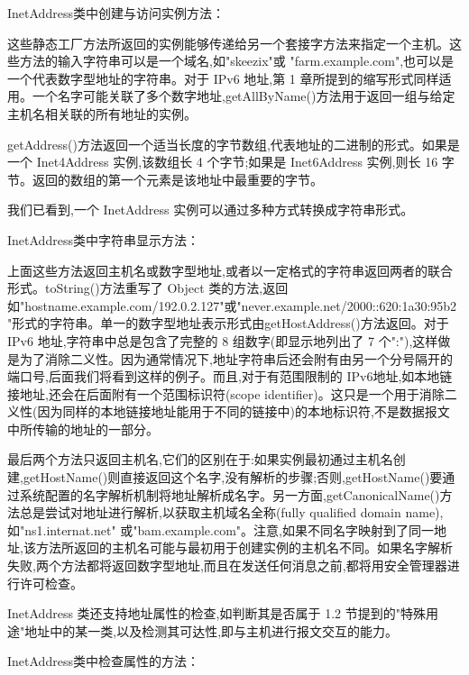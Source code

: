 		InetAddress类中创建与访问实例方法：

		

		这些静态工厂方法所返回的实例能够传递给另一个套接字方法来指定一个主机。这些方法的输入字符串可以是一个域名,如"skeezix"或 "farm.example.com",也可以是一个代表数字型地址的字符串。对于 IPv6 地址,第 1 章所提到的缩写形式同样适用。一个名字可能关联了多个数字地址,getAllByName()方法用于返回一组与给定主机名相关联的所有地址的实例。

		getAddress()方法返回一个适当长度的字节数组,代表地址的二进制的形式。如果是一个 Inet4Address 实例,该数组长 4 个字节;如果是 Inet6Address 实例,则长 16 字节。返回的数组的第一个元素是该地址中最重要的字节。

		我们已看到,一个 InetAddress 实例可以通过多种方式转换成字符串形式。

		InetAddress类中字符串显示方法：

		

		上面这些方法返回主机名或数字型地址,或者以一定格式的字符串返回两者的联合形式。toString()方法重写了 Object 类的方法,返回如"hostname.example.com/192.0.2.127"或"never.example.net/2000::620:1a30:95b2 "形式的字符串。单一的数字型地址表示形式由getHostAddress()方法返回。对于 IPv6 地址,字符串中总是包含了完整的 8 组数字(即显示地列出了 7 个":"),这样做是为了消除二义性。因为通常情况下,地址字符串后还会附有由另一个分号隔开的端口号,后面我们将看到这样的例子。而且,对于有范围限制的 IPv6地址,如本地链接地址,还会在后面附有一个范围标识符(scope identifier)。这只是一个用于消除二义性(因为同样的本地链接地址能用于不同的链接中)的本地标识符,不是数据报文中所传输的地址的一部分。

		最后两个方法只返回主机名,它们的区别在于:如果实例最初通过主机名创建,getHostName()则直接返回这个名字,没有解析的步骤;否则,getHostName()要通过系统配置的名字解析机制将地址解析成名字。另一方面,getCanonicalName()方法总是尝试对地址进行解析,以获取主机域名全称(fully qualified domain name),如"ns1.internat.net" 或"bam.example.com"。注意,如果不同名字映射到了同一地址,该方法所返回的主机名可能与最初用于创建实例的主机名不同。如果名字解析失败,两个方法都将返回数字型地址,而且在发送任何消息之前,都将用安全管理器进行许可检查。

		InetAddress 类还支持地址属性的检查,如判断其是否属于 1.2 节提到的"特殊用途"地址中的某一类,以及检测其可达性,即与主机进行报文交互的能力。

		InetAddress类中检查属性的方法：

